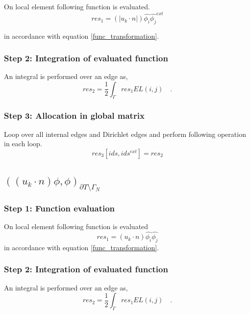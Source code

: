 \documentclass[a4paper,openany]{book}
\begin{document}
On local element following function is evaluated.
\begin{equation}
res_1 = (|u_k \cdot n|) \hat{\phi_i} \hat{\phi_j}^{ext} 
\end{equation}

in accordance with equation \eqref{func_transformation}.\\

\subsubsection{Step 2: Integration of evaluated function}

An integral is performed over an edge as,
\begin{equation}
res_2 = \frac{1}{2} \int_{\Gamma} res_1 EL(i,j) \quad \textrm{.}
\end{equation}

\subsubsection{Step 3: Allocation in global matrix}

Loop over all internal edges and Dirichlet edges and perform following operation in each loop.
\begin{equation}
res_3[ids,ids^{ext}] = res_2
\end{equation}

\subsection{$((u_k \cdot n)\phi,\phi)_{\partial T \setminus \Gamma_N}$}

\subsubsection{Step 1: Function evaluation}

On local element following function is evaluated 
\begin{equation}
res_1 = (u_k \cdot n) \hat{\phi_i} \hat{\phi_j}
\end{equation} 
in accordance with equation \eqref{func_transformation}.\\

\subsubsection{Step 2: Integration of evaluated function}

An integral is performed over an edge as,
\begin{equation}
res_2 = \frac{1}{2} \int_{\Gamma} res_1 EL(i,j)  \quad \textrm{.}
\end{equation}
\end{document}
